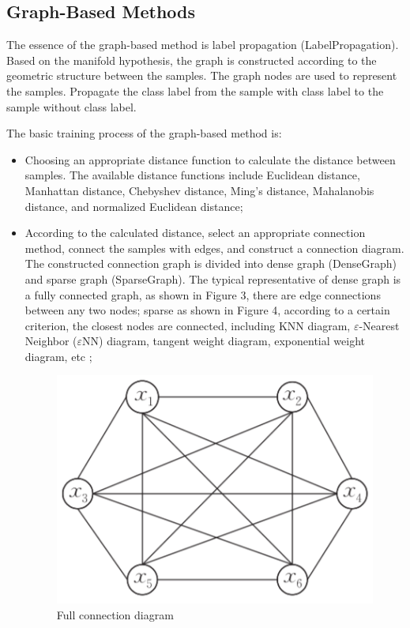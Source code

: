 \documentclass[11pt,en]{elegantpaper}
\begin{document}
\subsection{Graph-Based Methods}
The essence of the graph-based method\cite{chen2018survey} is label propagation (LabelPropagation). Based on the manifold hypothesis, the graph is constructed according to the geometric structure between the samples. The graph nodes are used to represent the samples. Propagate the class label from the sample with class label to the sample without class label.


The basic training process of the graph-based method\cite{chong2020graph} is:
\begin{itemize}
	\item Choosing an appropriate distance function to calculate the distance between samples. The available distance functions include Euclidean distance, Manhattan distance, Chebyshev distance, Ming's distance, Mahalanobis distance, and normalized Euclidean distance;
	\item According to the calculated distance, select an appropriate connection method, connect the samples with edges, and construct a connection diagram. The constructed connection graph is divided into dense graph (DenseGraph) and sparse graph (SparseGraph). The typical representative of dense graph is a fully connected graph, as shown in Figure 3, there are edge connections between any two nodes; sparse as shown in Figure 4, according to a certain criterion, the closest nodes are connected, including KNN diagram, $\varepsilon$-Nearest Neighbor ($\varepsilon$NN) diagram, tangent weight diagram, exponential weight diagram, etc ;
	\begin{figure}[H]
		\centering
		\includegraphics[scale=0.4]{figure/3.png}
		\caption{Full connection diagram}

\end{figure}
\end{itemize}
\end{document}
